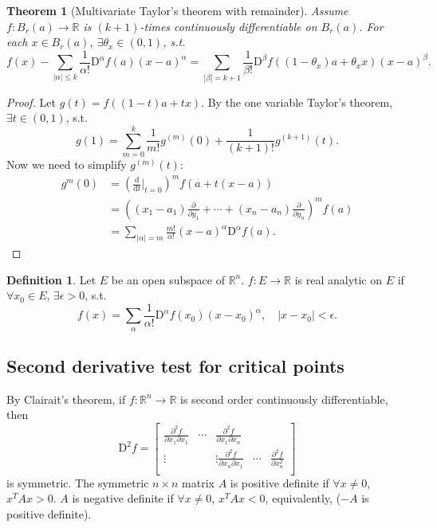 \documentclass[12pt]{article}
\theoremstyle{plain}
\newtheorem{thm}{Theorem}
\theoremstyle{definition}
\newtheorem*{defn}{Definition}
\begin{document}
\begin{thm}[Multivariate Taylor's theorem with remainder]
    Assume $f:B_r(a)\rightarrow\mathbb{R}$ is $(k+1)$-times continuously differentiable on $B_r(a)$.
    For each $x\in B_r(a)$, $\exists \theta_x\in(0,1)$, s.t.\
    \[
        f(x) - \sum_{|\alpha|\leq k}\frac{1}{\alpha!}\mathrm{D}^\alpha f(a) (x-a)^\alpha = \sum_{|\beta|=k+1}\frac{1}{\beta!}\mathrm{D}^\beta f((1-\theta_x)a+\theta_xx)(x-a)^\beta.
    \]
\end{thm}
\begin{proof}
    Let $g(t) = f((1-t)a+tx)$.
    By the one variable Taylor's theorem, $\exists t\in(0,1)$, s.t.
    \[
        g(1) = \sum_{m=0}^k \frac{1}{m!} g^{(m)}(0) + \frac{1}{(k+1)!} g^{(k+1)}(t).
    \]
    Now we need to simplify $g^{(m)}(t)$:
    \[\begin{aligned}
            g^{m}(0)
            &=\left(\frac{\mathrm{d}}{\mathrm{d}t}\Big|_{t=0}\right)^m f(a+t(x-a))\\
            &= ((x_1-a_1)\frac{\partial}{\partial y_1} + \cdots + (x_n-a_n)\frac{\partial}{\partial y_n})^m f(a)\\
            &= \sum_{|\alpha|=m}\frac{m!}{\alpha!}(x-a)^\alpha\mathrm{D}^\alpha f(a).
    \end{aligned}\]
\end{proof}


\begin{defn}
    Let $E$ be an open subspace of $\mathbb{R}^n$.
    $f:E\rightarrow \mathbb{R}$ is real analytic on $E$ if $\forall x_0\in E$, $\exists \epsilon>0$, s.t.\ 
    \[
        f(x)=\sum_\alpha \frac{1}{\alpha!}\mathrm{D}^\alpha f(x_0)(x-x_0)^\alpha,\quad |x-x_0|<\epsilon.
    \]
\end{defn}

\subsection*{Second derivative test for critical points}
By Clairait's theorem, if $f:\mathbb{R}^n\rightarrow\mathbb{R}$ is second order continuously differentiable, then
\[
    \mathrm{D}^2f=\begin{bmatrix}
        \frac{\partial^2 f}{\partial x_1\partial x_1}&\cdots&\frac{\partial^2f}{\partial x_1\partial x_n}\\
        \vdots&&\vdots
        \frac{\partial^2 f}{\partial x_n\partial x_1}&\cdots&\frac{\partial^2f}{\partial x_n^2}\\
    \end{bmatrix}
\]
is symmetric.
The symmetric $n\times n$ matrix $A$ is positive definite if $\forall x\neq 0$, $x^TAx>0$.
$A$ is negative definite if $\forall x\neq 0$, $x^TAx<0$, equivalently, ($-A$ is positive definite).
\end{document}
